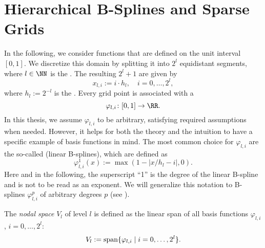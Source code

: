 

\chapter{Hierarchical B-Splines and Sparse Grids}
\label{sec:sg}

In the following, we consider functions that are defined on the unit interval
$[0, 1]$.
We discretize this domain by splitting it into $2^l$ equidistant segments,
where $l \in \NN$ is the .
The resulting $2^l + 1$  are given by
\begin{equation}
  x_{l,i} := i \cdot h_l,\quad
  i = 0, \dotsc, 2^l,
\end{equation}
where $h_l := 2^{-l}$ is the .
Every grid point is associated with a 
\begin{equation}
  \varphi_{l,i}\colon [0, 1] \to \RR.
\end{equation}
In this thesis, we assume $\varphi_{l,i}$ to be arbitrary,
satisfying required assumptions when needed.
However, it helps for both the theory and the intuition to have a
specific example of basis functions in mind.
The most common choice for $\varphi_{l,i}$ are the so-called 
(linear B-splines), which are defined as
\begin{equation}
  \varphi_{l,i}^1(x)
  := \max(1 - |x/h_l - i|, 0).
\end{equation}
Here and in the following,
the superscript ``1'' is the degree of the linear B-spline and
is not to be read as an exponent.
We will generalize this notation to B-splines $\varphi_{l,i}^p$ of
arbitrary degrees $p$ (see ).

The \emph{nodal space} $V_l$ of level $l$
is defined as the linear span of all basis functions
$\varphi_{l,i}$, $i = 0, \dotsc, 2^l$:
\begin{equation}
  V_l := \operatorname{span}\{\varphi_{l,i} \mid i = 0, \dotsc, 2^l\}.
\end{equation}

